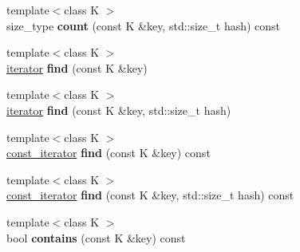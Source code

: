 \begin{DoxyCompactItemize}
{\footnotesize template$<$class K $>$ }\\size\+\_\+type {\bfseries count} (const K \&key, std\+::size\+\_\+t hash) const
\item 
\mbox{\label{classtsl_1_1detail__ordered__hash_1_1ordered__hash_ad7a350d9034a207a86ae33a306db5226}} 
{\footnotesize template$<$class K $>$ }\\\mbox{\hyperlink{classtsl_1_1detail__ordered__hash_1_1ordered__hash_1_1ordered__iterator}{iterator}} {\bfseries find} (const K \&key)
\item 
\mbox{\label{classtsl_1_1detail__ordered__hash_1_1ordered__hash_a0fbbef4dd3fadf649bce19167bb86d84}} 
{\footnotesize template$<$class K $>$ }\\\mbox{\hyperlink{classtsl_1_1detail__ordered__hash_1_1ordered__hash_1_1ordered__iterator}{iterator}} {\bfseries find} (const K \&key, std\+::size\+\_\+t hash)
\item 
\mbox{\label{classtsl_1_1detail__ordered__hash_1_1ordered__hash_a69478f5d912ac3c916c1734d6d3f8f86}} 
{\footnotesize template$<$class K $>$ }\\\mbox{\hyperlink{classtsl_1_1detail__ordered__hash_1_1ordered__hash_1_1ordered__iterator}{const\+\_\+iterator}} {\bfseries find} (const K \&key) const
\item 
\mbox{\label{classtsl_1_1detail__ordered__hash_1_1ordered__hash_a863d8605301cb957808cae9533617846}} 
{\footnotesize template$<$class K $>$ }\\\mbox{\hyperlink{classtsl_1_1detail__ordered__hash_1_1ordered__hash_1_1ordered__iterator}{const\+\_\+iterator}} {\bfseries find} (const K \&key, std\+::size\+\_\+t hash) const
\item 
\mbox{\label{classtsl_1_1detail__ordered__hash_1_1ordered__hash_ac263dffa886aa3362b27c0362bcd7ede}} 
{\footnotesize template$<$class K $>$ }\\bool {\bfseries contains} (const K \&key) const
\item 
\mbox{\label{classtsl_1_1detail__ordered__hash_1_1ordered__hash_a2b528de7d05845f485fe38d948f3dd88}} 

\end{DoxyCompactItemize}
